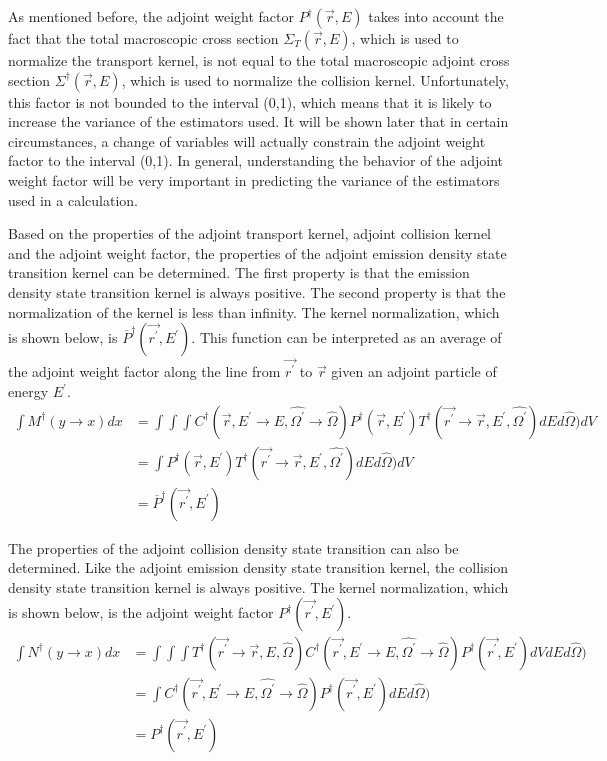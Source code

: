 As mentioned before, the adjoint weight factor $P^{\dagger}(\vec{r},E)$ takes 
into account the fact that the total macroscopic cross section 
$\Sigma_T(\vec{r},E)$, which is used to normalize the transport kernel, is not 
equal to the total macroscopic adjoint cross section 
$\Sigma^{\dagger}(\vec{r},E)$, which is used to normalize the collision kernel. 
Unfortunately, this factor is not bounded to the interval (0,1), which means
that it is likely to increase the variance of the estimators used. It will be 
shown later that in certain circumstances, a change of variables will actually 
constrain the adjoint weight factor to the interval (0,1). In general, 
understanding the behavior of the adjoint weight factor will be very important 
in predicting the variance of the estimators used in a calculation.

Based on the properties of the adjoint transport kernel, adjoint collision
kernel and the adjoint weight factor, the properties of the adjoint emission
density state transition kernel can be determined. The first property is that
the emission density state transition kernel is always positive. The second
property is that the normalization of the kernel is less than infinity. The
kernel normalization, which is shown below, is 
$\overline{P}^{\dagger}(\vec{r^{'}},E^{'})$. This function can be interpreted as
an average of the adjoint weight factor along the line from $\vec{r^{'}}$ to
$\vec{r}$ given an adjoint particle of energy $E^{'}$.
\begin{align}
  \int M^{\dagger}(y \to x)dx & = \int\int\int 
  C^{\dagger}(\vec{r},E^{'} \to E,\hat{\Omega^{'}} \to \hat{\Omega})
  P^{\dagger}(\vec{r},E^{'}) 
  T^{\dagger}(\vec{r^{'}} \to \vec{r},E^{'},\hat{\Omega^{'}}) dE d\hat{\Omega}) dV
  \nonumber \\
  & = \int P^{\dagger}(\vec{r},E^{'})
  T^{\dagger}(\vec{r^{'}} \to \vec{r},E^{'},\hat{\Omega^{'}}) dE d\hat{\Omega}) dV
  \nonumber \\
  & = \overline{P}^{\dagger}(\vec{r^{'}},E^{'}) 
\end{align}

The properties of the adjoint collision density state transition can also be
determined. Like the adjoint emission density state transition kernel, the 
collision density state transition kernel is always positive. The kernel
normalization, which is shown below, is the adjoint weight factor 
$P^{\dagger}(\vec{r^{'}},E^{'})$. 
\begin{align}
  \int N^{\dagger}(y \to x)dx & = \int\int\int
  T^{\dagger}(\vec{r^{'}} \to \vec{r},E,\hat{\Omega})
  C^{\dagger}(\vec{r^{'}},E^{'} \to E,\hat{\Omega^{'}} \to \hat{\Omega})
  P^{\dagger}(\vec{r^{'}},E^{'}) dV dE d\hat{\Omega}) 
  \nonumber \\
  & = \int C^{\dagger}(\vec{r^{'}},E^{'} \to E,\hat{\Omega^{'}} \to \hat{\Omega})
  P^{\dagger}(\vec{r^{'}},E^{'}) dE d\hat{\Omega})
  \nonumber \\
  & = P^{\dagger}(\vec{r^{'}},E^{'}) 
\end{align}


